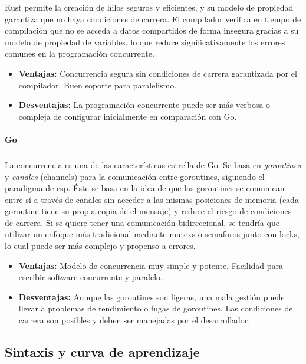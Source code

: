 Rust permite la creación de hilos seguros y eficientes, y su modelo de propiedad garantiza que no haya condiciones de carrera. El compilador verifica en tiempo de compilación que no se acceda a datos compartidos de forma insegura gracias a su modelo de propiedad de variables, lo que reduce significativamente los errores comunes en la programación concurrente.
\begin{itemize}
    \item \textbf{Ventajas:} Concurrencia segura sin condiciones de carrera garantizada por el compilador. Buen soporte para paralelismo.
    \item \textbf{Desventajas:} La programación concurrente puede ser más verbosa o compleja de configurar inicialmente en comparación con Go.
\end{itemize}

\paragraph{Go}
\subparagraph{}

La concurrencia es una de las características estrella de Go. Se basa en \textit{goroutines} y \textit{canales} (channels) para la comunicación entre goroutines, siguiendo el paradigma de \acrfull{csp}.
Éste se basa en la idea de que las goroutines se comunican entre sí a través de canales sin acceder a las mismas posiciones de memoria (cada goroutine tiene su propia copia de el mensaje) y reduce el riesgo de condiciones de carrera.
Si se quiere tener una comunicación bidireccional, se tendría que utilizar un enfoque más tradicional mediante \glspl{mutex} o \glspl{semaforo} junto con \glspl{lock}, lo cual puede ser más complejo y propenso a errores.
\begin{itemize}
    \item \textbf{Ventajas:} Modelo de concurrencia muy simple y potente. Facilidad para escribir software concurrente y paralelo.
    \item \textbf{Desventajas:} Aunque las goroutines son ligeras, una mala gestión puede llevar a problemas de rendimiento o fugas de goroutines. Las condiciones de carrera son posibles y deben ser manejadas por el desarrollador.
\end{itemize}

\subsection{Sintaxis y curva de aprendizaje}
